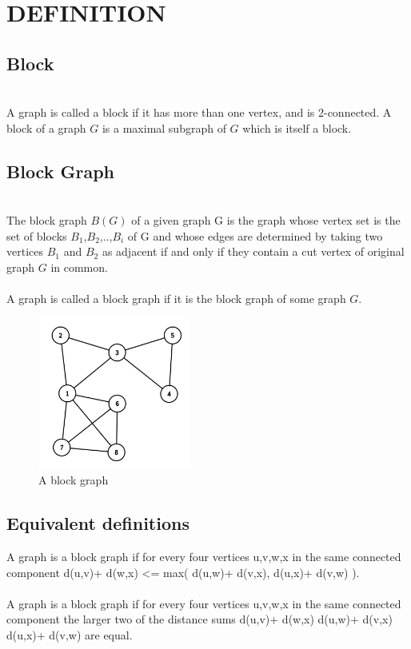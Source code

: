 \documentclass{memoir}
\title{\fontfamily{ptm}\selectfont{\textbf{BLOCK GRAPHS}}} %
\author{
        \textbf{Bishwajeet Kumar Sharma}\\ 
        \text{MT2020169}\\
        bishwajeet.sharma@iiitb.ac.in
        \and
        \textbf{Milan Gupta}\\
        \text{MT2020120}\\
        milan.gupta@iiitb.ac.in
        \and
        \textbf{Himanshu Singh}\\
        \text{MT2020143}\\
        himanshu.singh@iiitb.ac.in
}
\date{IIIT Bangalore}
\begin{document}
\maketitle %


\section*{DEFINITION}
\subsection{Block}
\\A graph is called a block if it has more
than one vertex, and is 2-connected. A block of a graph $G$ is a maximal subgraph of $G$ which is itself a block. 
\subsection{Block Graph}
\\The block graph $B(G)$ of a given graph G is the graph whose vertex set is the set of blocks {$B_1$,$B_2$,..,$B_i$} of G and whose edges are determined by taking two vertices $B_1$ and $B_2$ as adjacent if and only if they contain a cut vertex of original graph $G$ in common.
\\
\\A graph is called a block graph if it is the block graph of some graph $G$. 
\begin{figure}[htp]
    \centering
    \includegraphics[width=5cm]{graph.png}
    \caption{A block graph}
    \label{fig:1}
\end{figure}

\subsection{Equivalent definitions}
A graph is a block graph if for every four vertices u,v,w,x in the same connected component d(u,v)+ d(w,x) <= max( d(u,w)+ d(v,x), d(u,x)+ d(v,w) ).
\\
\\
A graph is a block graph if for every four vertices u,v,w,x in the same connected component the larger two of the distance sums
d(u,v)+ d(w,x)
d(u,w)+ d(v,x)
d(u,x)+ d(v,w)
are equal.
\end{document}
